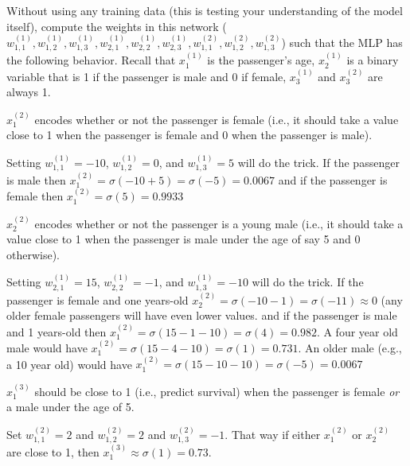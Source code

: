 \documentclass[assignment06_Solutions]{subfiles}
\begin{document}
\begin{exercise}[(30 minutes)]
Without using any training data (this is testing your understanding of the model itself), compute the weights in this network ($w^{(1)}_{1,1}, w^{(1)}_{1,2}, w^{(1)}_{1,3}, w^{(1)}_{2,1}, w^{(1)}_{2,2}, w^{(1)}_{2,3}, w^{(2)}_{1,1}, w^{(2)}_{1,2}, w^{(2)}_{1,3}$) such that the MLP has the following behavior.  Recall that $x^{(1)}_1$ is the passenger's age, $x^{(1)}_2$ is a binary variable that is 1 if the passenger is male and 0 if female, $x^{(1)}_3$ and $x^{(2)}_3$ are always 1.
\bes
\item $x^{(2)}_1$ encodes whether or not the passenger is female (i.e., it should take a value close to 1 when the passenger is female and 0 when the passenger is male).
\begin{boxedsolution}
Setting $w^{(1)}_{1,1} = -10$, $w^{(1)}_{1,2} = 0$, and $w^{(1)}_{1,3} = 5$ will do the trick.  If the passenger is male then $x^{(2)}_1 = \sigma(-10 + 5) = \sigma(-5) = 0.0067$ and if the passenger is female then $x^{(2)}_1 = \sigma(5) = 0.9933$
\end{boxedsolution}
\item $x^{(2)}_2$ encodes whether or not the passenger is a young male (i.e., it should take a value close to 1 when the passenger is male under the age of say 5 and 0 otherwise).
\begin{boxedsolution}
Setting $w^{(1)}_{2,1} = 15$, $w^{(1)}_{2,2} = -1$, and $w^{(1)}_{1,3} = -10$ will do the trick.  If the passenger is female and one years-old $x^{(2)}_2 = \sigma(-10 - 1) = \sigma(-11) \approx 0$ (any older female passengers will have even lower values. and if the passenger is male and 1 years-old then $x^{(2)}_1 = \sigma(15 - 1 - 10) = \sigma(4) = 0.982$.  A four year old male would have $x^{(2)}_1 = \sigma(15 - 4 - 10) = \sigma(1) = 0.731$.  An older male (e.g., a 10 year old) would have $x^{(2)}_1 = \sigma(15 - 10 - 10) = \sigma(-5) = 0.0067$
\end{boxedsolution}
\item $x^{(3)}_1$ should be close to 1 (i.e., predict survival) when the passenger is female \emph{or} a male under the age of 5.
\begin{boxedsolution}
Set $w^{(2)}_{1,1} = 2$ and $w^{(2)}_{1,2} = 2$ and $w^{(2)}_{1,3} = -1$.  That way if either $x^{(2)}_1$ or $x^{(2)}_2$ are close to 1, then $x^{(3)}_1 \approx \sigma(1) = 0.73$.
\end{boxedsolution}
\ees
\end{exercise}
\end{document}
